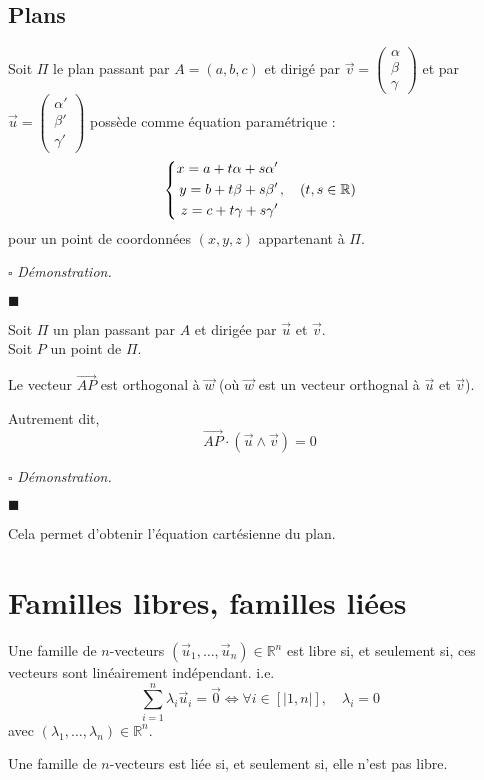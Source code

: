 \documentclass[a4paper, titlepage]{article}
\newenvironment{system}%
{\left\lbrace\begin{align}}%
{\end{align}\right.}
\renewenvironment{proof}{$\square$ \footnotesize\textit{Démonstration.}}{\begin{flushright}$\blacksquare$\end{flushright}}
\begin{document}
	\subsection{Plans}
	\begin{props}
		Soit $\Pi$ le plan passant par $A=(a,b,c)$ et dirigé par $\vec v = \begin{pmatrix} \alpha\\\beta\\\gamma \end{pmatrix}$ et par $\vec u = \begin{pmatrix} \alpha'\\\beta'\\\gamma' \end{pmatrix}$ possède comme équation paramétrique :
		$$\begin{system}
			x=a+t\alpha+s\alpha'\\
			y=b+t\beta+s\beta'\\
			z=c+t\gamma+s\gamma'
		\end{system},\quad (t,s\in\mathbb{R})$$
		pour un point de coordonnées $(x,y,z)$ appartenant à $\Pi$.
	\end{props}
	\begin{proof}
		\AQT
	\end{proof}
	\begin{props}
		Soit $\Pi$ un plan passant par $A$ et dirigée par $\vec u$ et $\vec v$.\\
		Soit $P$ un point de $\Pi$.

		Le vecteur $\overrightarrow{AP}$ est orthogonal à $\vec w$ (où $\vec w$ est un vecteur orthognal à $\vec u$ et $\vec v$).

		Autrement dit, $$ \overrightarrow{AP}\cdot (\vec u\land\vec v) = 0 $$
	\end{props}
	\begin{proof}
		\AQT
	\end{proof}
	Cela permet d'obtenir l'équation cartésienne du plan.
	\section{Familles libres, familles liées}
	\begin{defn}
		Une famille de $n$-vecteurs $(\vec u_1,\ldots,\vec u_n)\in\mathbb{R}^n$ est libre si, et seulement si, ces vecteurs sont linéairement indépendant. i.e.
		$$ \sum_{i=1}^{n} \lambda_i\vec u_i = \vec 0\iff \forall i\in[|1,n|],\quad\lambda_i = 0 $$
		avec $(\lambda_1,\ldots,\lambda_n)\in\mathbb{R}^n$.
	\end{defn}
	\begin{defn}
		Une famille de $n$-vecteurs est liée si, et seulement si, elle n'est pas libre.
	\end{defn}
\end{document}
